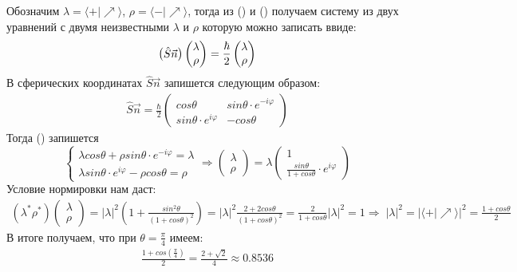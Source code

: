 \documentclass[__main__.tex]{subfiles}
\begin{document}
	Обозначим $\lambda = \langle+|\nearrow\rangle$, $\rho = \langle-|\nearrow\rangle$, тогда из () и () получаем систему из двух уравнений с двумя неизвестными $\lambda$ и $\rho$ которую можно записать ввиде:
	\begin{gather}
		\llabel{ch-16-4}
		\begin{pmatrix} \hat{S}\vec{n} \end{pmatrix}\begin{pmatrix} \lambda \\ \rho \end{pmatrix} = \frac{\hbar}{2}	\begin{pmatrix} \lambda \\ \rho\end{pmatrix}
	\end{gather}
	В сферических координатах $\hat{S}\vec{n}$ запишется следующим образом:
	\begin{gather*}
		\hat{S}\vec{n} = \frac{\hbar}{2}\begin{pmatrix} cos\theta & sin\theta\cdot e^{-i\varphi} \\ sin\theta\cdot e^{i\varphi} & -cos\theta \end{pmatrix}
	\end{gather*}
	Тогда () запишется
	\begin{equation*}
		\begin{cases}
			\lambda cos\theta + \rho sin\theta\cdot e^{-i\varphi} = \lambda \\
			\lambda sin\theta\cdot e^{i\varphi} - \rho cos\theta = \rho
		\end{cases}
		\Rightarrow
			\begin{pmatrix} \lambda \\ \rho \end{pmatrix} = \lambda	\begin{pmatrix} 1 \\ \frac{sin\theta}{1+cos\theta}\cdot e^{i\varphi}\end{pmatrix}
	\end{equation*}
	Условие нормировки нам даст:
	\begin{gather*}
		\left(\lambda^{*}\rho^{*}\right)\begin{pmatrix}\lambda \\ \rho \end{pmatrix} = |\lambda|^2\left(1+\frac{sin^2\theta}{(1+cos\theta)^2}\right) = |\lambda|^2\frac{2+2cos\theta}{(1+cos\theta)^2} = \frac{2}{1+cos\theta}|\lambda|^2 = 1  \Rightarrow \; |\lambda|^2 = \left|\langle+|\nearrow\rangle\right|^2 = \frac{1+cos\theta}{2}
	\end{gather*}
	В итоге получаем, что при $\theta = \frac\pi4$ имеем:
	\begin{gather*}
		\frac{1+cos\left(\frac{\pi}{4}\right)}{2} = \frac{2+\sqrt{2}}{4} \approx 0.8536
	\end{gather*}
\end{document}
